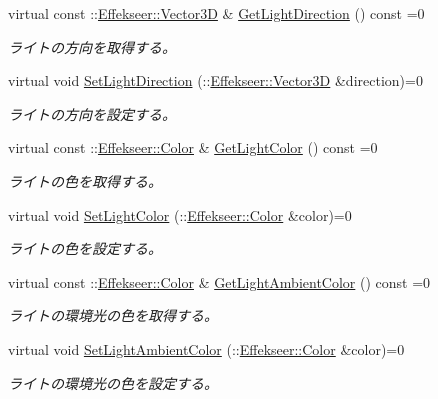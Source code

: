 \begin{DoxyCompactItemize}
virtual const \+::\mbox{\hyperlink{struct_effekseer_1_1_vector3_d}{Effekseer\+::\+Vector3D}} \& \mbox{\hyperlink{class_effekseer_renderer_1_1_renderer_a3da04ff6d2ad2a0126a7476703a7c019}{Get\+Light\+Direction}} () const =0
\begin{DoxyCompactList}\small\item\em ライトの方向を取得する。 \end{DoxyCompactList}\item 
virtual void \mbox{\hyperlink{class_effekseer_renderer_1_1_renderer_a28d4468e4a1ca40c585e7b6c88dd1849}{Set\+Light\+Direction}} (\+::\mbox{\hyperlink{struct_effekseer_1_1_vector3_d}{Effekseer\+::\+Vector3D}} \&direction)=0
\begin{DoxyCompactList}\small\item\em ライトの方向を設定する。 \end{DoxyCompactList}\item 
virtual const \+::\mbox{\hyperlink{struct_effekseer_1_1_color}{Effekseer\+::\+Color}} \& \mbox{\hyperlink{class_effekseer_renderer_1_1_renderer_af1ed44772dd362bd7dbed42823da0411}{Get\+Light\+Color}} () const =0
\begin{DoxyCompactList}\small\item\em ライトの色を取得する。 \end{DoxyCompactList}\item 
virtual void \mbox{\hyperlink{class_effekseer_renderer_1_1_renderer_a53268363d6c1ed36bd9119860d058808}{Set\+Light\+Color}} (\+::\mbox{\hyperlink{struct_effekseer_1_1_color}{Effekseer\+::\+Color}} \&color)=0
\begin{DoxyCompactList}\small\item\em ライトの色を設定する。 \end{DoxyCompactList}\item 
virtual const \+::\mbox{\hyperlink{struct_effekseer_1_1_color}{Effekseer\+::\+Color}} \& \mbox{\hyperlink{class_effekseer_renderer_1_1_renderer_a1454194ae4005f7a9d5a66f4f56c4972}{Get\+Light\+Ambient\+Color}} () const =0
\begin{DoxyCompactList}\small\item\em ライトの環境光の色を取得する。 \end{DoxyCompactList}\item 
virtual void \mbox{\hyperlink{class_effekseer_renderer_1_1_renderer_aebc954d0b421ded11b7420361b987094}{Set\+Light\+Ambient\+Color}} (\+::\mbox{\hyperlink{struct_effekseer_1_1_color}{Effekseer\+::\+Color}} \&color)=0
\begin{DoxyCompactList}\small\item\em ライトの環境光の色を設定する。 \end{DoxyCompactList}\item 

\end{DoxyCompactItemize}

